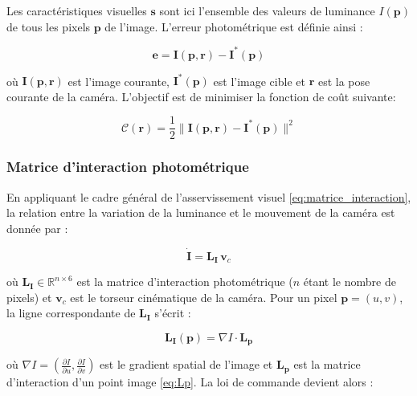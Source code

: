 \vspace{0.5cm}
Les caractéristiques visuelles $\mathbf{s}$ sont ici l'ensemble des valeurs  de luminance $I(\mathbf{p})$ de tous les pixels $\mathbf{p}$ de l'image. 
L'erreur photométrique est définie ainsi :

\begin{equation}
    \mathbf{e} = \mathbf{I}(\mathbf{p}, \mathbf{r}) - \mathbf{I}^*(\mathbf{p})
    \label{eq:erreur_photo}
\end{equation}

où $\mathbf{I}(\mathbf{p}, \mathbf{r})$ est l'image courante, 
$\mathbf{I}^*(\mathbf{p})$ est l'image cible et $\mathbf{r}$ est la 
pose courante de la caméra. L'objectif est de minimiser la fonction de 
coût suivante:

\begin{equation}
    \mathcal{C}(\mathbf{r}) = \frac{1}{2} \|\mathbf{I}(\mathbf{p}, \mathbf{r}) 
    - \mathbf{I}^*(\mathbf{p})\|^2
    \label{eq:cout_photo}
\end{equation}

\subsubsection{Matrice d'interaction photométrique}

En appliquant le cadre général de l'asservissement visuel \eqref{eq:matrice_interaction}, 
la relation entre la variation de la luminance et le mouvement de la caméra 
est donnée par \cite{ref7} :

\begin{equation}
    \dot{\mathbf{I}} = \mathbf{L_I} \, \mathbf{v}_c
    \label{eq:Li}
\end{equation}

où $\mathbf{L_I} \in \mathbb{R}^{n \times 6}$ est la matrice d'interaction 
photométrique ($n$ étant le nombre de pixels) et $\mathbf{v}_c$ est le 
torseur cinématique de la caméra. Pour un pixel $\mathbf{p} = (u, v)$, 
la ligne correspondante de $\mathbf{L_I}$ s'écrit :

\begin{equation}
    \mathbf{L_I}(\mathbf{p}) = \nabla I \cdot \mathbf{L_p}
    \label{eq:Li_pixel}
\end{equation}

où $\nabla I = \left(\frac{\partial I}{\partial u}, \frac{\partial I}{\partial v}\right)$ 
est le gradient spatial de l'image et $\mathbf{L_p}$ est la matrice 
d'interaction d'un point image \eqref{eq:Lp}. La loi de commande devient 
alors :

